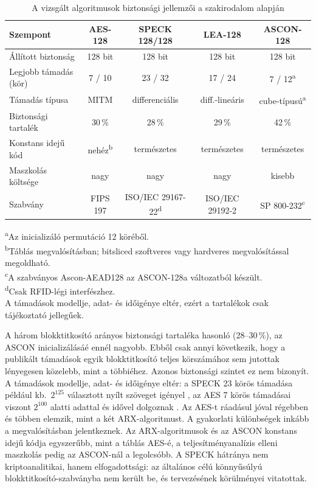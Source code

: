 \documentclass[a4paper,12pt]{report}
\theoremstyle{definition}
\theoremstyle{remark}
\begin{document}
\begin{table}[h!]
\centering
\caption{A vizsgált algoritmusok biztonsági jellemzői a szakirodalom alapján}
\label{table:security_compare}
\footnotesize
\vspace{.2 cm}
\setlength{\tabcolsep}{3.5pt}
\begin{tabular}{lcccc}
\hline
\textbf{Szempont} & \textbf{AES-128} & \textbf{SPECK 128/128} & \textbf{LEA-128} & \textbf{ASCON-128} \\
\hline
Állított biztonság & 128 bit & 128 bit & 128 bit & 128 bit \\
Legjobb támadás (kör) & 7 / 10 & 23 / 32 & 17 / 24 & 7 / 12\textsuperscript{a} \\
Támadás típusa & MITM & differenciális & diff.-lineáris & cube-típusú\textsuperscript{a} \\
Biztonsági tartalék & 30\,\% & 28\,\% & 29\,\% & 42\,\% \\
Konstans idejű kód & nehéz\textsuperscript{b} & természetes & természetes & természetes \\
Maszkolás költsége & nagy & nagy & nagy & kisebb \\
Szabvány & FIPS 197 & ISO/IEC 29167-22\textsuperscript{d} & ISO/IEC 29192-2 & SP 800-232\textsuperscript{c} \\
\hline
\end{tabular}
\begin{flushleft}
\footnotesize
\textsuperscript{a}Az inicializáló permutáció 12 köréből.\\
\textsuperscript{b}Táblás megvalósításban; bitsliced szoftveres vagy hardveres megvalósítással megoldható.\\
\textsuperscript{c}A szabványos Ascon-AEAD128 az ASCON-128a változatból készült.\\
\textsuperscript{d}Csak RFID-légi interfészhez.\\
A támadások modellje, adat- és időigénye eltér, ezért a tartalékok csak tájékoztató jellegűek.
\end{flushleft}
\end{table}

A három blokktitkosító arányos biztonsági tartaléka hasonló (28--30\,\%), az ASCON inicializálásáé ennél nagyobb. Ebből csak annyi következik, hogy a publikált támadások egyik blokktitkosító teljes körszámához sem jutottak lényegesen közelebb, mint a többiéhez. Azonos biztonsági szintet ez nem bizonyít. A támadások modellje, adat- és időigénye eltér: a SPECK 23 körös támadása például kb.\ $2^{125}$ választott nyílt szöveget igényel \cite{Song2016}, az AES 7 körös támadásai viszont $2^{100}$ alatti adattal és idővel dolgoznak \cite{Derbez2013}. Az AES-t ráadásul jóval régebben és többen elemzik, mint a két ARX-algoritmust. A gyakorlati különbségek inkább a megvalósításban jelentkeznek. Az ARX-algoritmusok és az ASCON konstans idejű kódja egyszerűbb, mint a táblás AES-é, a teljesítményanalízis elleni maszkolás pedig az ASCON-nál a legolcsóbb. A SPECK hátránya nem kriptoanalitikai, hanem elfogadottsági: az általános célú könnyűsúlyú blokktitkosító-szabványba nem került be, és tervezésének körülményei vitatottak.
\end{document}
